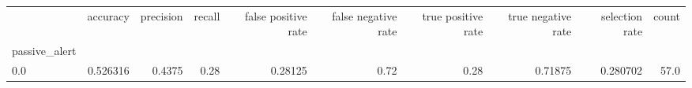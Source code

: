 \begin{tabular}{lrrrrrrrrr}
\toprule
{} &  accuracy &  precision &  recall &  false positive rate &  false negative rate &  true positive rate &  true negative rate &  selection rate &  count \\
passive\_alert &           &            &         &                      &                      &                     &                     &                 &        \\
\midrule
0.0           &  0.526316 &     0.4375 &    0.28 &              0.28125 &                 0.72 &                0.28 &             0.71875 &        0.280702 &   57.0 \\
\bottomrule
\end{tabular}
